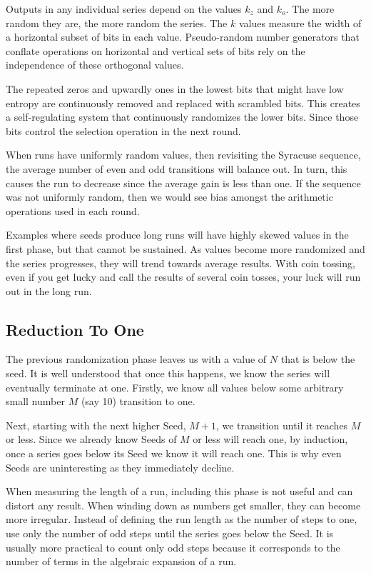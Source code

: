\documentclass[preprint,natbib]{sigplanconf}
\begin{document}
Outputs in any individual series depend on the values $k_z$ and $k_o$. The more random they are, the more random the series. The $k$ values measure the width of a horizontal subset of bits in each value. Pseudo-random number generators that conflate operations on horizontal and vertical sets of bits rely on the independence of these orthogonal values.

The repeated zeros and upwardly ones in the lowest bits that might have low entropy are continuously removed and replaced with scrambled bits. This creates a self-regulating system that continuously randomizes the lower bits. Since those bits control the selection operation in the next round.

When runs have uniformly random values, then revisiting the Syracuse sequence, the average number of even and odd transitions will balance out. In turn, this causes the run to decrease since the average gain is less than one. If the sequence was not uniformly random, then we would see bias amongst the arithmetic operations used in each round.

Examples where seeds produce long runs will have highly skewed values in the first phase, but that cannot be sustained. As values become more randomized and the series progresses, they will trend towards average results. With coin tossing, even if you get lucky and call the results of several coin tosses, your luck will run out in the long run.

\subsection{Reduction To One}

The previous randomization phase leaves us with a value of \( N \) that is below the seed. It is well understood that once this happens, we know the series will eventually terminate at one. Firstly, we know all values below some arbitrary small number \( M \) (say 10) transition to one.

Next, starting with the next higher Seed, \( M + 1 \), we transition until it reaches \( M \) or less. Since we already know Seeds of \( M \) or less will reach one, by induction, once a series goes below its Seed we know it will reach one. This is why even Seeds are uninteresting as they immediately decline.

When measuring the length of a run, including this phase is not useful and can distort any result. When winding down as numbers get smaller, they can become more irregular. Instead of defining the run length as the number of steps to one, use only the number of odd steps until the series goes below the Seed. It is usually more practical to count only odd steps because it corresponds to the number of terms in the algebraic expansion of a run.
\end{document}
